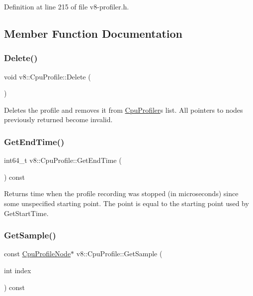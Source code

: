 Definition at line 215 of file v8-\/profiler.\+h.



\subsection{Member Function Documentation}
\mbox{\label{classv8_1_1CpuProfile_a70c93f0c14d07a7e1bad42ee95665ca0}} 
\subsubsection{\texorpdfstring{Delete()}{Delete()}}
{\footnotesize\ttfamily void v8\+::\+Cpu\+Profile\+::\+Delete (\begin{DoxyParamCaption}{ }\end{DoxyParamCaption})}

Deletes the profile and removes it from \mbox{\hyperlink{classv8_1_1CpuProfiler}{Cpu\+Profiler}}\textquotesingle{}s list. All pointers to nodes previously returned become invalid. \mbox{\label{classv8_1_1CpuProfile_a56f1dce6cc312c207d58131bde5c8fb8}} 
\subsubsection{\texorpdfstring{Get\+End\+Time()}{GetEndTime()}}
{\footnotesize\ttfamily int64\+\_\+t v8\+::\+Cpu\+Profile\+::\+Get\+End\+Time (\begin{DoxyParamCaption}{ }\end{DoxyParamCaption}) const}

Returns time when the profile recording was stopped (in microseconds) since some unspecified starting point. The point is equal to the starting point used by Get\+Start\+Time. \mbox{\label{classv8_1_1CpuProfile_adc6e2d7e63530752f3ab168586a19b65}} 
\subsubsection{\texorpdfstring{Get\+Sample()}{GetSample()}}
{\footnotesize\ttfamily const \mbox{\hyperlink{classv8_1_1CpuProfileNode}{Cpu\+Profile\+Node}}$\ast$ v8\+::\+Cpu\+Profile\+::\+Get\+Sample (\begin{DoxyParamCaption}\item[{int}]{index }\end{DoxyParamCaption}) const}

